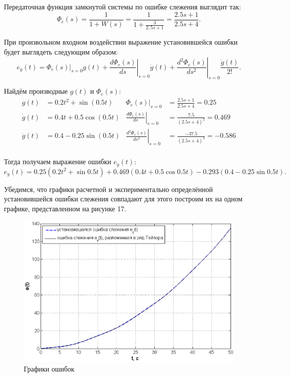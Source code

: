\documentclass[12pt,a4paper]{article}
\begin{document}
Передаточная функция замкнутой системы по ошибке слежения выглядит так:
\begin{equation}
   \Phi_e(s) = \frac{1}{1 + W(s)} = \frac{1}{1 + \displaystyle{\frac{3}{2,5s + 1}}} = \frac{2.5s+1}{2.5s+4}.
\end{equation}\par
При произвольном входном воздействии выражение установившейся ошибки будет выглядеть следующим образом:
\begin{equation}
    e_y(t) = \Phi_e(s)|_{s=0}g(t) + \left.\frac{d\Phi_e(s)}{ds}\right|_{s=0}\dot{g}(t) + \left.\frac{d^2\Phi_e(s)}{ds^2}\right|_{s=0}\frac{\ddot{g}(t)}{2!}.
\end{equation}\par
Найдём производные $g(t)$ и $\Phi_e(s)$:
\begin{align*}
    g(t) & = 0.2t^2 + \sin{(0.5t)} & \Phi_e(s)|_{s=0} & = \frac{2.5s+1}{2.5s+4} = 0.25 \\
    \dot{g}(t) & = 0.4t + 0.5\cos{(0.5t)} & \left.\frac{d\Phi_e(s)}{ds}\right|_{s=0} & = \frac{7.5}{(2.5s+4)^2} = 0.469 \\
    \ddot{g}(t) & = 0.4 - 0.25\sin{(0.5t)} & \left.\frac{d^2\Phi_e(s)}{ds^2}\right|_{s=0} & = \frac{-37.5}{(2.5s+4)^3} = -0.586 \\
\end{align*}\par
Тогда получаем выражение ошибки $e_y(t)$:
\begin{equation}
e_y(t) = 0.25(0.2t^2 + \sin{0.5t}) + 0.469(0.4t + 0.5\cos{0.5t}) - 0.293(0.4 - 0.25\sin{0.5t}).
\end{equation}\par
Убедимся, что графики расчетной и экспериментально определённой установившейся ошибки слежения совпадают для этого построим их на одном графике, представленном на рисунке 17.
\begin{figure}[H]
    \centering
    \includegraphics[width=1\linewidth]{4.2.eps}
    \caption{Графики ошибок}
\end{figure}
\end{document}
